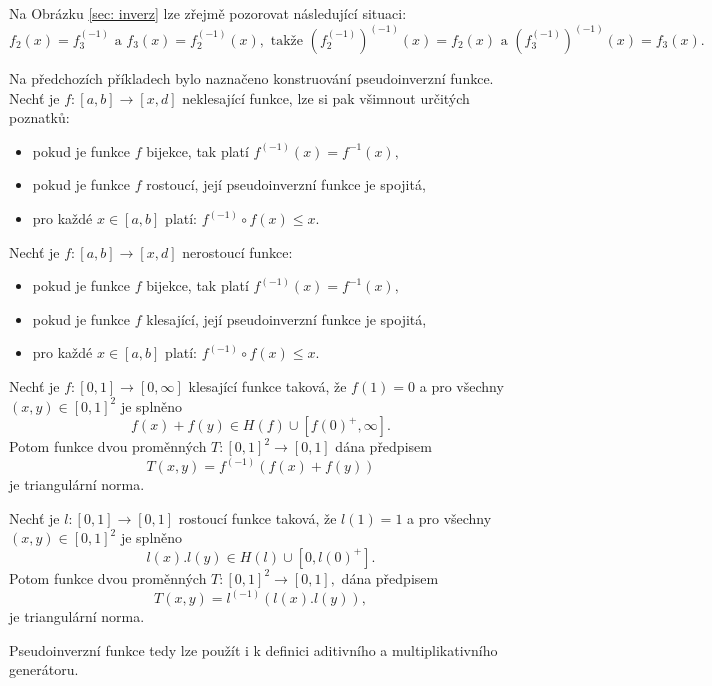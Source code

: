 Na Obrázku \ref{sec: inverz} lze zřejmě pozorovat následující situaci: $$f_2(x)=f_3^{(-1)}\text{ a } f_3(x)=f_2^{(-1)}(x), \text{ takže } (f_2^{(-1)})^{(-1)}(x)=f_2(x) \text{ a }
            (f_3^{(-1)})^{(-1)}(x)=f_3(x).$$ 
\begin{remark} Na předchozích příkladech bylo naznačeno konstruování pseudoinverzní funkce. Nech\v t je $f:[a,b] \rightarrow [x,d]$ neklesající funkce, lze si pak všimnout určitých poznatk\r u:
    \begin{itemize}
        \item pokud je funkce $f$ bijekce, tak platí $f^{(-1)}(x) = f^{-1}(x),$
        \item  pokud je funkce $f$ rostoucí, její pseudoinverzní funkce je spojitá,
        \item  pro každé $x \in [a,b]$ platí: $f^{(-1)}\circ f(x)\leq x.$
    \end{itemize}
    Nech\v t je $f:[a,b] \rightarrow [x,d]$ nerostoucí funkce:
    \begin{itemize}
        \item pokud je funkce $f$ bijekce, tak platí $f^{(-1)}(x) = f^{-1}(x),$
        \item  pokud je funkce $f$ klesající, její pseudoinverzní funkce je spojitá,
        \item  pro každé $x \in [a,b]$ platí: $f^{(-1)}\circ f(x)\leq x.$
    \end{itemize}
\end{remark}

\begin{sentence} \cite{KMP}
    Nech\v t je $f:[0,1] \rightarrow [0,\infty]$ klesající funkce
    taková, že $f(1)=0$ a pro všechny $(x,y) \in [0,1]^2$  je splněno
    $$f(x)+f(y) \in H(f) \cup [f(0)^+,\infty].$$
    Potom funkce dvou proměnných $T:[0,1]^2 \rightarrow [0,1]$ dána předpisem
    $$T(x,y)=f^{(-1)}(f(x)+f(y))$$
    je triangulární norma.
\end{sentence}
\begin{sentence}\cite{KMP}
    Nech\v t je $l:[0,1] \rightarrow [0,1]$ rostoucí funkce
    taková, že $l(1)=1$ a pro všechny $(x,y) \in [0,1]^2$  je splněno
    $$l(x).l(y) \in H(l) \cup [0,l(0)^+].$$
    Potom funkce dvou proměnných $T:[0,1]^2 \rightarrow [0,1],$ dána předpisem
    $$T(x,y)=l^{(-1)}(l(x).l(y)),$$
    je triangulární norma.
\end{sentence}

Pseudoinverzní funkce tedy lze použít i k definici aditivního a multiplikativního generátoru.


